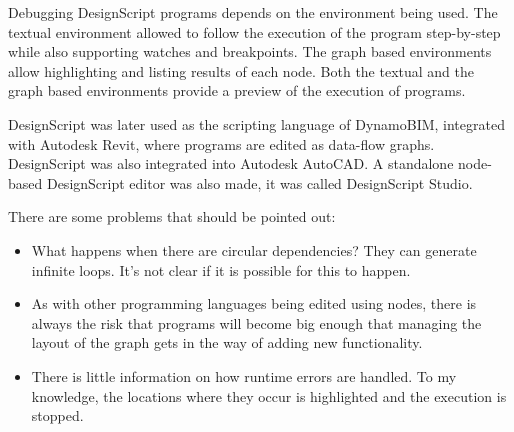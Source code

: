 \documentclass{./llncs2e/llncs}
\begin{document}
	Debugging DesignScript programs depends on the environment being used. The textual environment allowed to follow the execution of the program step-by-step while also supporting watches and breakpoints. The graph based environments allow highlighting and listing results of each node. Both the textual and the graph based environments provide a preview of the execution of programs.

	
	DesignScript was later used as the scripting language of DynamoBIM, integrated with Autodesk Revit, where programs are edited as data-flow graphs. DesignScript was also integrated into Autodesk AutoCAD. A standalone node-based DesignScript editor was also made, it was called DesignScript Studio.

	There are some problems that should be pointed out:
	\begin{itemize}
		\item What happens when there are circular dependencies? They can generate infinite loops. It's not clear if it is possible for this to happen.
		\item As with other programming languages being edited using nodes, there is always the risk that programs will become big enough that managing the layout of the graph gets in the way of adding new functionality. 
		\item There is little information on how runtime errors are handled. To my knowledge, the locations where they occur is highlighted and the execution is stopped.
	\end{itemize}


\end{document}
